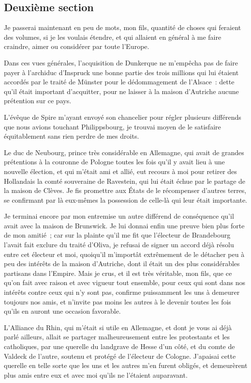 \documentclass[french,twoside]{book} %
\begin{document}
\subsection[{Deuxième section}]{Deuxième section}
\noindent Je passerai maintenant en peu de mots, mon fils, quantité de choses qui feraient des volumes, si je les voulais étendre, et qui allaient en général à me faire craindre, aimer ou considérer par toute l’Europe.\par
Dans ces vues générales, l’acquisition de Dunkerque ne m’empêcha pas de faire payer à l’archiduc d’Inspruck une bonne partie des trois millions qui lui étaient accordés par le traité de Münster pour le dédommagement de l’Alsace : dette qu’il était important d’acquitter, pour ne laisser à la maison d’Autriche aucune prétention sur ce pays.\par
L’évêque de Spire m’ayant envoyé son chancelier pour régler plusieurs différends que nous avions touchant Philippsbourg, je trouvai moyen de le satisfaire équitablement sans rien perdre de mes droits.\par
Le duc de Neubourg, prince très considérable en Allemagne, qui avait de grandes prétentions à la couronne de Pologne toutes les fois qu’il y avait lieu à une nouvelle élection, et qui m’était ami et allié, eut recours à moi pour retirer des Hollandais la comté souveraine de Ravestein, qui lui était échue par le partage de la maison de Clèves. Je fis promettre aux États de le récompenser d’autres terres, se confirmant par là eux-mêmes la possession de celle-là qui leur était importante.\par
Je terminai encore par mon entremise un autre différend de conséquence qu’il avait avec la maison de Brunswick. Je lui donnai enfin une preuve bien plus forte de mon amitié ; car sur la plainte qu’il me fit que l’électeur de Brandebourg l’avait fait exclure du traité d’Oliva, je refusai de signer un accord déjà résolu entre cet électeur et moi, quoiqu’il m’importât extrêmement de le détacher peu à peu des intérêts de la maison d’Autriche, dont il était un des plus considérables partisans dans l’Empire. Mais je crus, et il est très véritable, mon fils, que ce qu’on fait avec raison et avec vigueur tout ensemble, pour ceux qui sont dans nos intérêts contre ceux qui n’y sont pas, confirme puissamment les uns à demeurer toujours nos amis, et n’invite pas moins les autres à le devenir toutes les fois qu’ils en auront une occasion favorable.\par
L’Alliance du Rhin, qui m’était si utile en Allemagne, et dont je vous ai déjà parlé ailleurs, allait se partager malheureusement entre les protestants et les catholiques, par une querelle du landgrave de Hesse d’un côté, et du comte de Valdeck de l’autre, soutenu et protégé de l’électeur de Cologne. J’apaisai cette querelle en telle sorte que les uns et les autres m’en furent obligés, et demeurèrent plus amis entre eux et avec moi qu’ils ne l’étaient auparavant.\par
\end{document}
